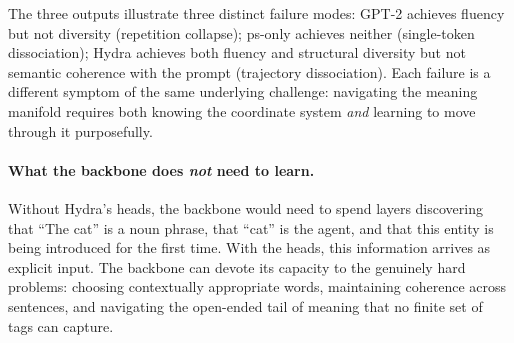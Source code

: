 \documentclass[11pt]{article}
\begin{document}
\noindent
The three outputs illustrate three distinct failure modes: GPT-2 
achieves fluency but not diversity (repetition collapse); ps-only 
achieves neither (single-token dissociation); Hydra achieves both 
fluency and structural diversity but not semantic coherence with the 
prompt (trajectory dissociation). Each failure is a different 
symptom of the same underlying challenge: navigating the meaning 
manifold requires both knowing the coordinate system \emph{and} 
learning to move through it purposefully.

\paragraph{What the backbone does \emph{not} need to learn.}
Without Hydra's heads, the backbone would need to spend layers 
discovering that ``The cat'' is a noun phrase, that ``cat'' is the 
agent, and that this entity is being introduced for the first time. 
With the heads, this information arrives as explicit input. The 
backbone can devote its capacity to the genuinely hard problems: 
choosing contextually appropriate words, maintaining coherence 
across sentences, and navigating the open-ended tail of meaning 
that no finite set of tags can capture.
\end{document}
